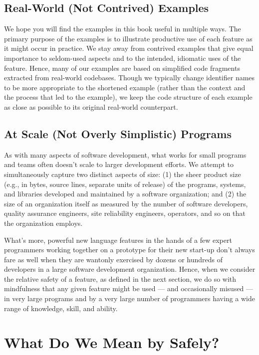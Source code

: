 \subsection{Real-World (Not Contrived) Examples}

We hope you will find the examples in this book useful in multiple ways. The primary purpose of the examples is to illustrate productive use of each feature as it might occur in practice. We stay away from contrived examples that give equal importance to seldom-used aspects and to the intended, idiomatic uses of the feature. Hence, many of our examples are based on simplified code fragments extracted from real-world codebases. Though we typically change identifier names to be more appropriate to the shortened example (rather than the context and the process that led to the example), we keep the code structure of each example as close as possible to its original real-world counterpart.

\subsection{At Scale (Not Overly Simplistic) Programs}

As with many aspects of software development, what works for small programs and teams often doesn’t scale to larger development efforts. We attempt to simultaneously capture two distinct aspects of size: (1) the sheer product size (e.g., in bytes, source lines, separate units of release) of the programs, systems, and libraries developed and maintained by a software organization; and (2) the size of an organization itself as measured by the number of software developers, quality assurance engineers, site reliability engineers, operators, and so on that the organization employs. 

What’s more, powerful new language features in the hands of a few expert programmers working together on a prototype for their new start-up don't always fare as well when they are wantonly exercised by dozens or hundreds of developers in a large software development organization. Hence, when we consider the relative safety of a feature, as defined in the next section, we do so with mindfulness that any given feature might be used --- and occasionally misused --- in very large programs and by a very large number of programmers having a wide range of knowledge, skill, and ability. %

\section[{What Do We Mean by {\sffamily\itshape Safely}?}]{What Do We Mean by {\sfbsectionitalRomeo Safely}?}


